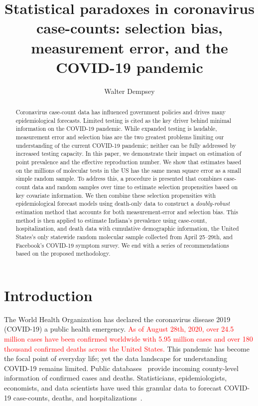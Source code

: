 \documentclass[12pt]{amsart}
\numberwithin{equation}{section}
\theoremstyle{plain}
\begin{document}
\title[Statistical paradoxes in coronavirus case-counts]{Statistical paradoxes in coronavirus case-counts: selection bias, measurement error, and the COVID-19 pandemic} %

\author{Walter Dempsey}
\address{Department of Biostatistics, University of Michigan, Ann Arbor, MI 48109}

\begin{abstract}
  Coronavirus case-count data has influenced government policies and drives many epidemiological forecasts. Limited testing is cited as the key driver behind minimal information on the COVID-19 pandemic. While expanded testing is laudable, measurement error and selection bias are the two greatest problems limiting our understanding of the current COVID-19 pandemic; neither can be fully addressed by increased testing capacity. In this paper, we demonstrate their impact on estimation of point prevalence and the effective reproduction number. We show that estimates based on the millions of molecular tests in the US has the same mean square error as a small simple random sample.  To address this, a procedure is presented that combines case-count data and random samples over time to estimate selection propensities based on key covariate information. We then combine these selection propensities with epidemiological forecast models using death-only data to construct a \emph{doubly-robust} estimation method that accounts for both measurement-error and selection bias.  This method is then applied to estimate Indiana's prevalence using case-count, hospitalization, and death data with cumulative demographic information, the United States's only statewide random molecular sample collected from April 25--29th, and Facebook's COVID-19 symptom survey.  We end with a series of recommendations based on the proposed methodology.
\end{abstract}

\maketitle


\section{Introduction}
The World Health Organization has declared the coronavirus disease 2019 (COVID-19) a public health emergency.  \textcolor{red}{As of August 28th, 2020, over 24.5 million cases have been confirmed worldwide with 5.95 million cases and over 180 thousand confirmed deaths across the United States.} This pandemic
has become the focal point of everyday life; yet the data landscape for understanding COVID-19 remains limited.  Public databases~\citep{JHU_Lancet,NYT} provide incoming county-level information of confirmed cases and deaths.  Statisticians, epidemiologists, economists, and data scientists have used this granular data to forecast COVID-19 case-counts, deaths, and hospitalizations~\citep{Giordano2020,Song2020,Ray2020,2020.IHME,Wang2020.03,JTD36385}.
\end{document}
